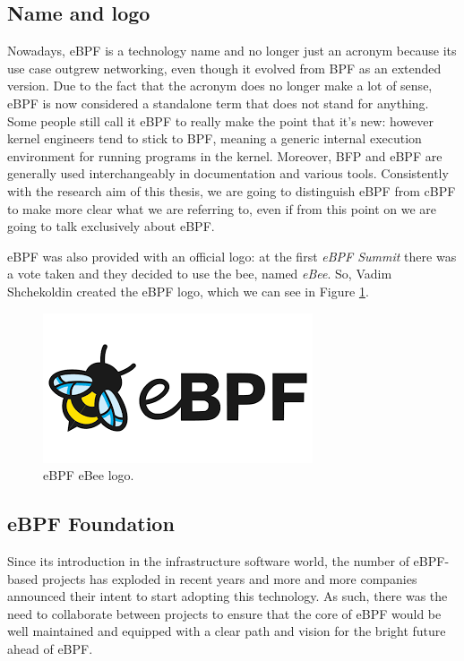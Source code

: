 \subsection{Name and logo}

Nowadays, eBPF is a technology name and no longer just an acronym because its use case outgrew networking, even though it evolved from BPF as an extended version.
Due to the fact that the acronym does no longer make a lot of sense, eBPF is now considered a standalone term that does not stand for anything.
Some people still call it eBPF to really make the point that it's new: however kernel engineers tend to stick to BPF, meaning a generic internal execution environment for running programs in the kernel.
Moreover, BFP and eBPF are generally used interchangeably in documentation and various tools.
Consistently with the research aim of this thesis, we are going to distinguish eBPF from cBPF to make more clear what we are referring to, even if from this point on we are going to talk exclusively about eBPF.

eBPF was also provided with an official logo: at the first \textit{eBPF Summit} there was a vote taken and they decided to use the bee, named \textit{eBee}.
So, Vadim Shchekoldin created the eBPF logo, which we can see in Figure \ref{fig:eBPF_logo}.

\begin{figure}[h]
	\centering
	\includegraphics[width=0.7\linewidth]{images/History/eBPF_logo.png}
	\caption{eBPF eBee logo.}
	\label{fig:eBPF_logo}
\end{figure}

\subsection{eBPF Foundation}

Since its introduction in the infrastructure software world, the number of eBPF-based projects has exploded in recent years and more and more companies announced their intent to start adopting this technology.
As such, there was the need to collaborate between projects to ensure that the core of eBPF would be well maintained and equipped with a clear path and vision for the bright future ahead of eBPF.

